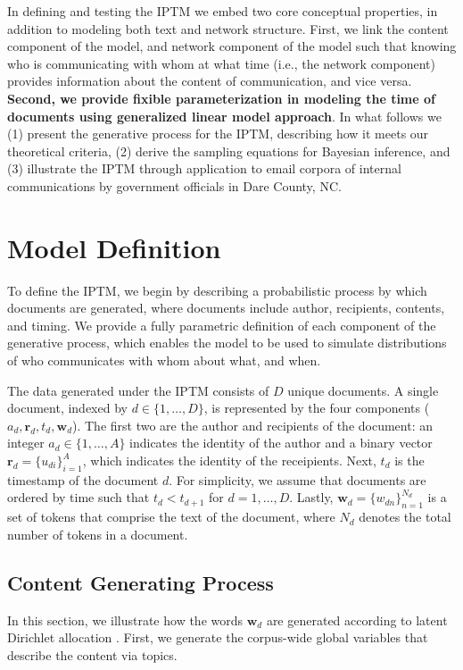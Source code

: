 \documentclass[twoside]{article}
\begin{document}
In defining and testing the IPTM we embed two core conceptual properties, in addition to modeling both text and network structure. First, we link the content component of the model, and network component of the model such that knowing who is communicating with whom at what time (i.e., the network component) provides information about the content of communication, and vice versa. \textbf{Second, we provide fixible parameterization in modeling the time of documents using generalized linear model approach}. In what follows we (1) present the generative process for the IPTM, describing how it meets our theoretical criteria, (2) derive the sampling equations for Bayesian inference, and (3) illustrate the IPTM through application to email corpora of internal communications by government officials in Dare County, NC. 

\section{Model Definition}
To define the IPTM, we begin by describing a probabilistic process by which documents are generated, where documents include author, recipients, contents, and timing. We provide a fully parametric definition of each component of the generative process, which enables the model to be used to simulate distributions of who communicates with whom about what, and when.

The data generated under the IPTM consists of $D$ unique documents. A single document, indexed by $d \in \{1,\ldots,D\}$, is represented by the four components ($a_d, \boldsymbol{r}_d, t_d,  \boldsymbol{w}_d$). The first two are the author and recipients of the document: an integer $a_d \in \{1,\ldots,A\}$ indicates the identity of the author and a binary vector $\boldsymbol{r}_d = \{u_{di} \}_{i=1}^{A}$, which indicates the identity of the receipients. Next, $t_d$ is the timestamp of the document $d$. For simplicity, we assume that documents are ordered by time such that $t_d < t_{d+1}$ for $d=1, \ldots, D$. Lastly, $ \boldsymbol{w}_d= \{w_{dn} \}_{n=1}^{N_d}$ is a set of tokens that comprise the text of the document, where $N_d$ denotes the total number of tokens in a document.

\subsection{Content Generating Process}\label{subsec:Content generating process}

In this section, we illustrate how the words $\boldsymbol{w}_d$ are generated according to latent Dirichlet allocation \citep{Blei2003}. First, we generate the corpus-wide global variables that describe the content via topics. 
\end{document}
